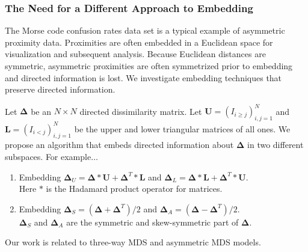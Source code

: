 \documentclass[professionalfonts, hyperref={pdfpagelabels=false,
  colorlinks=true, linkcolor=purple}]{beamer}
\begin{document}
\begin{frame}
  \frametitle{The Need for a Different Approach to Embedding}
    The Morse code confusion rates data set is a typical example of
    asymmetric proximity data. Proximities are often embedded in a
    Euclidean space for visualization and subsequent analysis. Because
    Euclidean distances are symmetric, asymmetric proximities are
    often symmetrized prior to embedding and directed information is
    lost. We investigate embedding techniques that preserve directed
    information.
  
    \vskip10pt Let $\bm{\Delta}$ be an $N \times N$ directed
    dissimilarity matrix. Let $\mathbf{U} = (I_{i \geq j})_{i,j=1}^{N}$ and
    $\mathbf{L} = (I_{i < j})_{i,j=1}^{N}$ be the upper and
    lower triangular matrices of all ones. We propose an algorithm
    that embeds directed information about $\bm{\Delta}$ in two
    different subspaces. For example{$\ldots$}
 \begin{enumerate}
 \item Embedding $\bm{\Delta}_U = \bm{\Delta} \ast \mathbf{U} +
   \bm{\Delta}^{T} \ast \mathbf{L}$ and $\bm{\Delta}_{L} = \bm{\Delta}
   \ast \mathbf{L} + \bm{\Delta}^{T} \ast \mathbf{U}$.\\ Here $\ast$ is
   the Hadamard product operator for matrices.
 \item Embedding $\bm{\Delta}_S = (\bm{\Delta} + \bm{\Delta}^{T})/2$
   and $\bm{\Delta}_{A} = (\bm{\Delta} -
   \bm{\Delta}^{T})/2$.\\$\bm{\Delta}_S$ and $\bm{\Delta}_{A}$ are the
   symmetric and skew-symmetric part of $\bm{\Delta}$.
  \end{enumerate}
  Our work is related to three-way MDS and asymmetric MDS models.
\end{frame}
\end{document}
